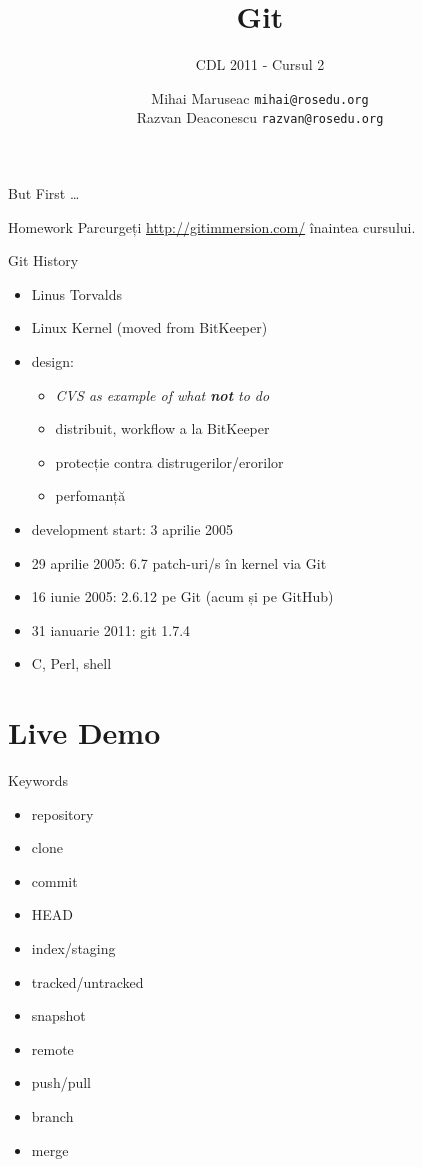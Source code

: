 \documentclass{beamer}
\title[]{Git}
\subtitle{CDL 2011 - Cursul 2}
\institute[]{ROSEdu}
\author[]{
  Mihai Maruseac \texttt{mihai@rosedu.org} \\
  Razvan Deaconescu \texttt{razvan@rosedu.org}
}
\begin{document}
\maketitle

\begin{frame}{But First \ldots}
  \begin{alertblock}{Homework}
    Parcurgeți \url{http://gitimmersion.com/} înaintea cursului.
  \end{alertblock}
\end{frame}

\begin{frame}{Git History}
  \begin{itemize}
    \item Linus Torvalds
    \item Linux Kernel (moved from BitKeeper)
    \item design:
      \begin{itemize}
        \item \textit{CVS as example of what \textbf{not} to do}
        \item distribuit, workflow a la BitKeeper
        \item protecție contra distrugerilor/erorilor
        \item perfomanță
      \end{itemize}
    \item development start: 3 aprilie 2005
    \item 29 aprilie 2005: 6.7 patch-uri/s în kernel via Git
    \item 16 iunie 2005: 2.6.12 pe Git (acum și pe GitHub)
    \item 31 ianuarie 2011: git 1.7.4
    \item C, Perl, shell
  \end{itemize}
\end{frame}

\section{Live Demo}

\begin{frame}{Keywords}
  \begin{itemize}
    \item repository
    \item clone
    \item commit
    \item HEAD
    \item index/staging
    \item tracked/untracked
    \item snapshot
    \item remote
    \item push/pull
    \item branch
    \item merge
  \end{itemize}
\end{frame}
\end{document}
